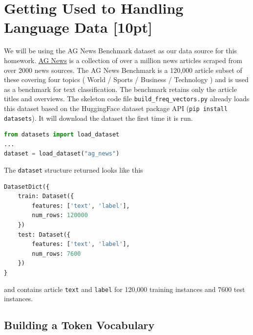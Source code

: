 \documentclass[a4paper,10pt]{article}
\begin{document}
\section{Getting Used to Handling Language Data [10pt]}
We will be using the AG News Benchmark \cite{Zhang2015CharacterlevelCN} dataset as our data source for this homework. \href{http://groups.di.unipi.it/~gulli/AG_corpus_of_news_articles.html}{AG News} is a collection of over a million news articles scraped from over 2000 news sources. The AG News Benchmark \cite{Zhang2015CharacterlevelCN} is a 120,000 article subset of these covering four topics ( World / Sports / Business / Technology ) and is used as a benchmark for text classification. The benchmark retains only the article titles and overviews. 
%
The skeleton code file \texttt{build\_freq\_vectors.py} already loads this dataset based on the HuggingFace dataset package API (\texttt{pip install datasets}). It will download the dataset the first time it is run.
%
\begin{center}
\begin{minipage}{0.8\textwidth}
\begin{lstlisting}[language=Python, caption=Code to load the AG News Dataset]
from datasets import load_dataset
...
dataset = load_dataset("ag_news")
\end{lstlisting}
\end{minipage}
\end{center}
%
The \texttt{dataset} structure returned looks like this
%
\begin{center}
\begin{minipage}{0.8\textwidth}
\begin{lstlisting}[language=Python, caption=AG News Dataset structure]
DatasetDict({
    train: Dataset({
        features: ['text', 'label'],
        num_rows: 120000
    })
    test: Dataset({
        features: ['text', 'label'],
        num_rows: 7600
    })
}
\end{lstlisting}
\end{minipage}
\end{center}
%
and contains article \texttt{text} and \texttt{label} for 120,000 training instances and 7600 test instances.


\subsection{Building a Token Vocabulary}
\end{document}
